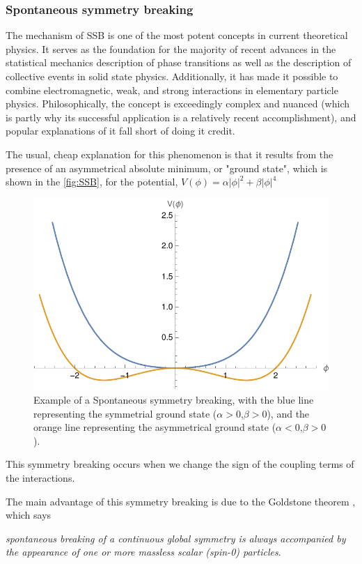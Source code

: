 \subsubsection{Spontaneous symmetry breaking}
The mechanism of SSB is one of the most potent concepts in current theoretical physics.
It serves as the foundation for the majority of recent advances in the statistical mechanics description of phase transitions as well as the description of collective events in solid state physics.
Additionally, it has made it possible to combine electromagnetic, weak, and strong interactions in elementary particle physics.
Philosophically, the concept is exceedingly complex and nuanced (which is partly why its successful application is a relatively recent accomplishment), and popular explanations of it fall short of doing it credit. 

The usual, cheap explanation for this phenomenon is that it results from the presence of an asymmetrical absolute minimum, or "ground state", which is shown in the \autoref{fig:SSB}, for the potential, $V(\phi)=\alpha |\phi|^2+\beta|\phi|^4$

\begin{figure}[H]
    \centering
	\includegraphics[width=0.7\linewidth]{graphs/SSB.pdf}
	\caption{Example of a Spontaneous symmetry breaking, with the blue line representing the symmetrial ground state ($\alpha>0$,$\beta>0$), and the orange line representing the asymmetrical ground state ($\alpha<0$,$\beta>0$).}
	\label{fig:SSB}
\end{figure}
\noindent This symmetry breaking occurs when we change the sign of the coupling terms of the interactions.

The main advantage of this symmetry breaking is due to the Goldstone theorem \cite{grif}, which says
\label{goldstone}

\textit{spontaneous breaking of a continuous
global symmetry is always accompanied by the appearance of one or more massless scalar
(spin-0) particles}.


